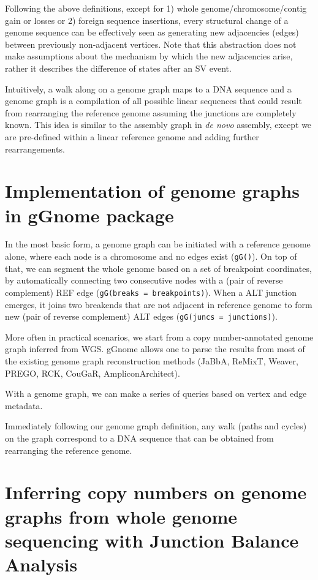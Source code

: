 \documentclass[phd,tocprelim]{cornell}
\begin{document}
% 
Following the above definitions, except for 1) whole genome/chromosome/contig gain or losses or 2) foreign sequence insertions, every structural change of a genome sequence can be effectively seen as generating new adjacencies (edges) between previously non-adjacent vertices. Note that this abstraction does not make assumptions about the mechanism by which the new adjacencies arise, rather it describes the difference of states after an SV event. 

Intuitively, a walk along on a genome graph maps to a DNA sequence and a genome graph is a compilation of all possible linear sequences that could result from rearranging the reference genome assuming the junctions are completely known. This idea is similar to the assembly graph in \textit{de novo} assembly, except we are pre-defined within a linear reference genome and adding further rearrangements.

\section{Implementation of genome graphs in gGnome package}

In the most basic form, a genome graph can be initiated with a reference genome alone, where each node is a chromosome and no edges exist (\texttt{gG()}). On top of that, we can segment the whole genome based on a set of breakpoint coordinates, by automatically connecting two consecutive nodes with a (pair of reverse complement) REF edge (\texttt{gG(breaks = breakpoints)}). When a ALT junction emerges, it joins two breakends that are not adjacent in reference genome to form new (pair of reverse complement) ALT edges (\texttt{gG(juncs = junctions)}).

More often in practical scenarios, we start from a copy number-annotated genome graph inferred from WGS. gGnome allows one to parse the results from most of the existing genome graph reconstruction methods (JaBbA, ReMixT, Weaver, PREGO, RCK, CouGaR, AmpliconArchitect). 

With a genome graph, we can make a series of queries based on vertex and edge metadata.

Immediately following our genome graph definition, any walk (paths and cycles) on the graph correspond to a DNA sequence that can be obtained from rearranging the reference genome.




\section{Inferring copy numbers on genome graphs from whole genome sequencing with Junction Balance Analysis}
\end{document}
